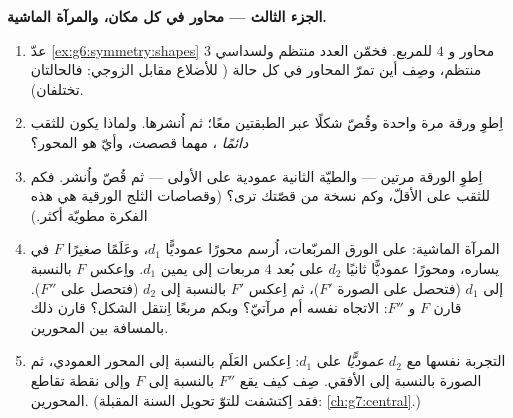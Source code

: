 \begin{problem}
\medskip
\noindent\textbf{الجزء الثالث --- محاور في كل مكان، والمرآة
الماشية.}
\begin{enumerate}[resume]
  \item عدّ \cref{ex:g6:symmetry:shapes} $3$ محاور
         و $4$ للمربع. فخمّن
        العدد  منتظم ولسداسي منتظم،
        وصِف أين تمرّ المحاور في كل حالة ( للأضلاع مقابل الزوجي: فالحالتان
        تختلفان).
  \item اِطوِ ورقة مرة واحدة وقُصّ شكلًا عبر الطبقتين
        معًا؛ ثم اُنشرها. ولماذا يكون للثقب \emph{دائمًا}
        ، مهما قصصت، وأيّ  هو
        المحور؟
  \item اِطوِ الورقة مرتين --- والطيّة الثانية عمودية
        على الأولى --- ثم قُصّ واُنشر. فكم  للثقب على الأقلّ، وكم
        نسخة من قصّتك ترى؟ (وقصاصات الثلج الورقية هي
        هذه الفكرة مطويّة أكثر.)
  \item المرآة الماشية: على الورق المربّعات، اُرسم محورًا عموديًّا
        $d_1$، وعَلَمًا صغيرًا $F$ في يساره، ومحورًا عموديًّا
        ثانيًا $d_2$ على بُعد $4$ مربعات إلى يمين $d_1$.
        واِعكس $F$ بالنسبة إلى $d_1$ (فتحصل على الصورة $F'$)، ثم اِعكس
        $F'$ بالنسبة إلى $d_2$ (فتحصل على $F''$). قارن $F$ و $F''$:
        الاتجاه نفسه أم مرآتيّ؟ وبكم مربعًا
        اِنتقل الشكل؟ قارن ذلك بالمسافة بين
        المحورين.
  \item التجربة نفسها مع $d_2$ \emph{عموديًّا} على
        $d_1$: اِعكس العَلَم بالنسبة إلى المحور العمودي، ثم
        الصورة بالنسبة إلى الأفقي. صِف كيف يقع $F''$
        بالنسبة إلى $F$ وإلى نقطة تقاطع
        المحورين. (فقد اِكتشفت للتوّ تحويل السنة
        المقبلة: \cref{ch:g7:central}.)
\end{enumerate}
\end{problem}
